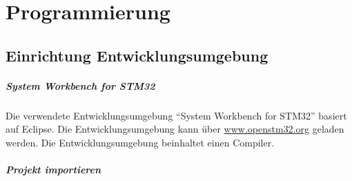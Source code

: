

\chapter{Programmierung}


\section{Einrichtung Entwicklungsumgebung}


\paragraph{System Workbench for STM32}

Die verwendete Entwicklungsumgebung "`System Workbench for STM32"' basiert auf Eclipse. Die Entwicklungsumgebung kann über \href{www.openstm32.org}{\color[rgb]{0,0,1} www.openstm32.org} geladen werden. Die Entwicklungsumgebung beinhaltet einen Compiler. 


\paragraph{Projekt importieren}


